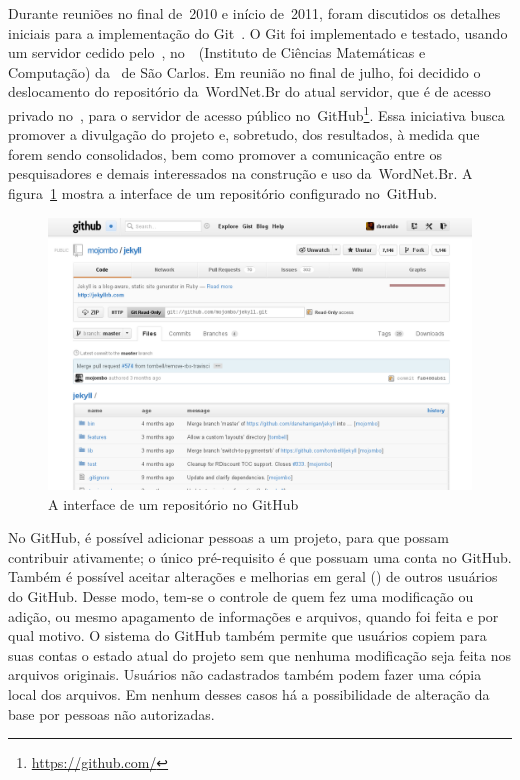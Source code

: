 Durante reuniões no final de~2010 e início de~2011, foram discutidos os
detalhes iniciais para a implementação do Git~\cite[p.~4]{beraldo11}. O Git foi
implementado e testado, usando um servidor cedido pelo~\nilc, no~\icmc\
(Instituto de Ciências Matemáticas e Computação) da \usp\ de São Carlos. Em
reunião no final de julho, foi decidido o deslocamento do repositório
da~WordNet.Br do atual servidor, que é de acesso privado no~\nilc, para o
servidor de acesso público no~GitHub\footnote{\url{https://github.com/}}. Essa
iniciativa busca promover a divulgação do projeto e, sobretudo, dos resultados,
à medida que forem sendo consolidados, bem como promover a comunicação entre os
pesquisadores e demais interessados na construção e uso da~WordNet.Br. A
figura~\ref{github:repositorio} mostra a interface de um repositório
configurado no~GitHub.

\begin{figure}[h]
  \centering
  \includegraphics[width=.9\textwidth]{img/repositorio.png}
  \caption{A interface de um repositório no GitHub}
  \label{github:repositorio}
\end{figure}

No GitHub, é possível adicionar pessoas a um projeto, para que possam
contribuir ativamente; o único pré-requisito é que possuam uma conta no GitHub.
Também é possível aceitar alterações e melhorias em geral (\en{\textit{“pull
requests”}}) de outros usuários do GitHub. Desse modo, tem-se o controle de
quem fez uma modificação ou adição, ou mesmo apagamento de informações e
arquivos, quando foi feita e por qual motivo. O sistema do GitHub também
permite que usuários copiem para suas contas o estado atual do projeto sem que
nenhuma modificação seja feita nos arquivos originais. Usuários não cadastrados
também podem fazer uma cópia local dos arquivos. Em nenhum desses casos há a
possibilidade de alteração da base por pessoas não autorizadas.

